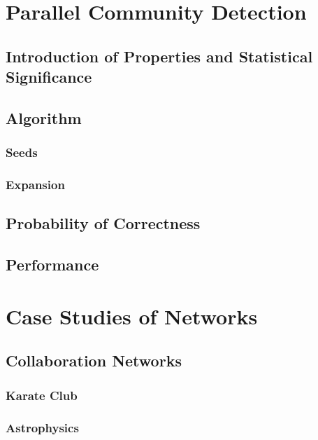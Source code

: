 \documentclass[phd,tocprelim]{cornell}
\begin{document}
\chapter{Parallel Community Detection}

\section {Introduction of Properties and Statistical Significance}

\section{Algorithm}

\subsection{Seeds}

\subsection{Expansion}

\section{Probability of Correctness}

\section {Performance}



\chapter{Case Studies of Networks}
\label{ch:datasets}




\section{Collaboration Networks}


\subsection{Karate Club}
\cite{zachary}

\subsection{Astrophysics}
\end{document}

